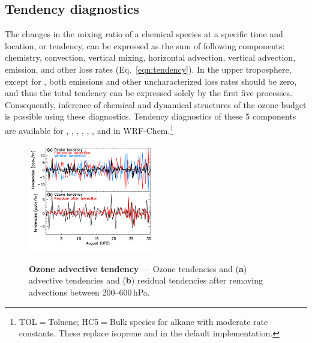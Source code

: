 \subsection{Tendency diagnostics}\label{ssec:2006/discuss/tendency}

The changes in the mixing ratio of a chemical species at a specific time and location, or tendency, can be expressed as
the sum of following components: chemistry, convection, vertical mixing, horizontal advection, vertical advection, emission,
and other loss rates (Eq.~\ref{eqn:tendency}). In the upper troposphere, except for , both emissions and other
uncharacterized loss rates should be zero, and thus the total tendency can be expressed solely by the first five processes.
Consequently, inference of chemical and dynamical structures of the ozone budget is possible using these diagnostics.
Tendency diagnostics of these 5 components are available for , , , , 
, , and  in WRF-Chem.\footnote{TOL$=$Toluene; HC5$=$Bulk species for alkane with moderate 
rate constants. These replace isoprene and  in the default implementation.}

	\begin{figure}
		\centering
		\begin{singlespacing}
		\vspace{-.2in}
		\label{fig:2006/tend_residual}
		\includegraphics[width=0.48\textwidth]{tendency/residual}
		\caption[Ozone advective tendency]{{\small\textbf{Ozone advective tendency} --- Ozone tendencies and ({\bf a}) advective tendencies
		and ({\bf b}) residual tendencies after removing advections between 200--600\,\unit{hPa}. \vspace{-.2in}}}
		\end{singlespacing}
	\end{figure}


